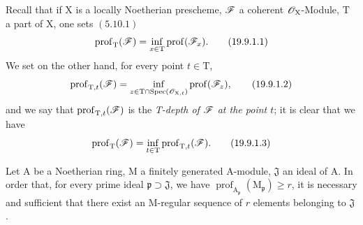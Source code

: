 \begin{env}[19.9.1]
\label{IV.19.9.1}
Recall that if $\mathrm{X}$ is a locally Noetherian prescheme, $\mathscr{F}$ a coherent $\mathscr{O}_\mathrm{X}$-Module, $\mathrm{T}$ a part of $\mathrm{X}$, one sets $(5.10.1)$
\begin{equation}
  \operatorname{prof}_\mathrm{T}(\mathscr{F})=\inf_{x\in\mathrm{T}}\operatorname{prof}(\mathscr{F}_x).
  \label{IV.19.9.1.1}
\tag{19.9.1.1}
\end{equation}
We set on the other hand, for every point $t\in\mathrm{T}$,
\begin{equation}
  \operatorname{prof}_{\mathrm{T},t}(\mathscr{F})=\inf_{z\in\mathrm{T}\cap\operatorname{Spec}(\mathscr{O}_{\mathrm{X},t})}\operatorname{prof}(\mathscr{F}_z),
  \label{IV.19.9.1.2}
\tag{19.9.1.2}
\end{equation}
and we say that $\operatorname{prof}_{\mathrm{T},t}(\mathscr{F})$ is the \emph{T-depth of $\mathscr{F}$ at the point $t$}; it is clear that we have
\begin{equation}
  \operatorname{prof}_\mathrm{T}(\mathscr{F})=\inf_{t\in\mathrm{T}}\operatorname{prof}_{\mathrm{T},t}(\mathscr{F}).
  \label{IV.19.9.1.3}
\tag{19.9.1.3}
\end{equation}
\end{env}

\begin{lemma}[19.9.2]
\label{IV.19.9.2}
Let $\mathrm{A}$ be a Noetherian ring, $\mathrm{M}$ a finitely generated $\mathrm{A}$-module, $\mathfrak{J}$ an ideal of $\mathrm{A}$. In order that, for every prime ideal $\mathfrak{p}\supset\mathfrak{J}$, we have $\operatorname{prof}_{\mathrm{A}_\mathfrak{p}}(\mathrm{M}_\mathfrak{p})\geqslant r$, it is necessary and sufficient that there exist an M-regular sequence of $r$ elements belonging to $\mathfrak{J}$.
\end{lemma}

